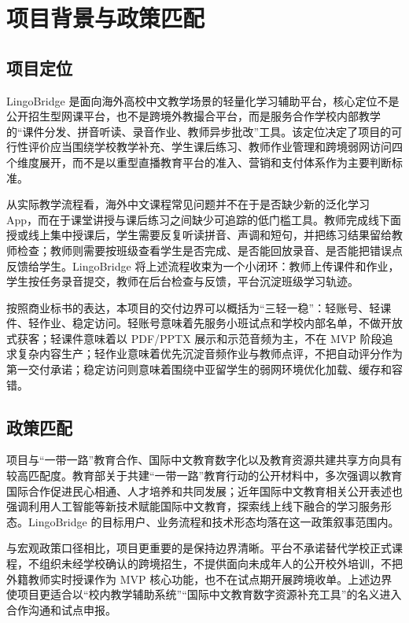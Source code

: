 \chapter{项目背景与政策匹配}

\section{项目定位}
LingoBridge 是面向海外高校中文教学场景的轻量化学习辅助平台，核心定位不是公开招生型网课平台，也不是跨境外教撮合平台，而是服务合作学校内部教学的“课件分发、拼音听读、录音作业、教师异步批改”工具。该定位决定了项目的可行性评价应当围绕学校教学补充、学生课后练习、教师作业管理和跨境弱网访问四个维度展开，而不是以重型直播教育平台的准入、营销和支付体系作为主要判断标准。

从实际教学流程看，海外中文课程常见问题并不在于是否缺少新的泛化学习 App，而在于课堂讲授与课后练习之间缺少可追踪的低门槛工具。教师完成线下面授或线上集中授课后，学生需要反复听读拼音、声调和短句，并把练习结果留给教师检查；教师则需要按班级查看学生是否完成、是否能回放录音、是否能把错误点反馈给学生。LingoBridge 将上述流程收束为一个小闭环：教师上传课件和作业，学生按任务录音提交，教师在后台检查与反馈，平台沉淀班级学习轨迹。

按照商业标书的表达，本项目的交付边界可以概括为“三轻一稳”：轻账号、轻课件、轻作业、稳定访问。轻账号意味着先服务小班试点和学校内部名单，不做开放式获客；轻课件意味着以 PDF/PPTX 展示和示范音频为主，不在 MVP 阶段追求复杂内容生产；轻作业意味着优先沉淀音频作业与教师点评，不把自动评分作为第一交付承诺；稳定访问则意味着围绕中亚留学生的弱网环境优化加载、缓存和容错。

\section{政策匹配}
项目与“一带一路”教育合作、国际中文教育数字化以及教育资源共建共享方向具有较高匹配度。教育部关于共建“一带一路”教育行动的公开材料中，多次强调以教育国际合作促进民心相通、人才培养和共同发展；近年国际中文教育相关公开表述也强调利用人工智能等新技术赋能国际中文教育，探索线上线下融合的学习服务形态\cite{Ref-BRIEducationAction,Ref-IntlChineseEduMOE}。LingoBridge 的目标用户、业务流程和技术形态均落在这一政策叙事范围内。

与宏观政策口径相比，项目更重要的是保持边界清晰。平台不承诺替代学校正式课程，不组织未经学校确认的跨境招生，不提供面向未成年人的公开校外培训，不把外籍教师实时授课作为 MVP 核心功能，也不在试点期开展跨境收单。上述边界使项目更适合以“校内教学辅助系统”“国际中文教育数字资源补充工具”的名义进入合作沟通和试点申报。


